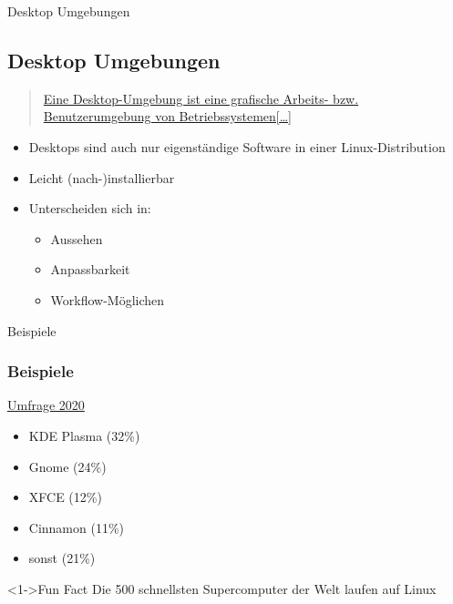 \begin{frame}{Desktop Umgebungen}
    \subsection{Desktop Umgebungen}\label{subsec:desktop-umgebungen}

    \pause

    \begin{quote}
        \href{https://de.wikipedia.org/wiki/Desktop-Umgebung}{Eine Desktop-Umgebung ist eine grafische Arbeits- bzw. Benutzerumgebung von Betriebssystemen[\ldots]}
    \end{quote}

    \pause

    \begin{itemize}
        \item Desktops sind auch nur eigenständige Software in einer Linux-Distribution\pause
        \item Leicht (nach-)installierbar\pause
        \item Unterscheiden sich in:\pause
        \begin{itemize}
            \item Aussehen\pause
            \item Anpassbarkeit\pause
            \item Workflow-Möglichen
        \end{itemize}
    \end{itemize}

\end{frame}

\begin{frame}{Beispiele}
    \subsubsection{Beispiele}\label{subsubsec:beispiele}

    \href{https://opensource.com/article/20/5/linux-desktops}{Umfrage 2020}

    \begin{itemize}
        \item<2-> KDE Plasma (32\%)
        \item<3-> Gnome (24\%)
        \item<4-> XFCE (12\%)
        \item<5-> Cinnamon (11\%)
        \item<6-> sonst (21\%)
    \end{itemize}

    \vspace{0.5cm}
    \begin{exampleblock}<1->{Fun Fact}
        Die 500 schnellsten Supercomputer der Welt laufen auf Linux
    \end{exampleblock}

\end{frame}

